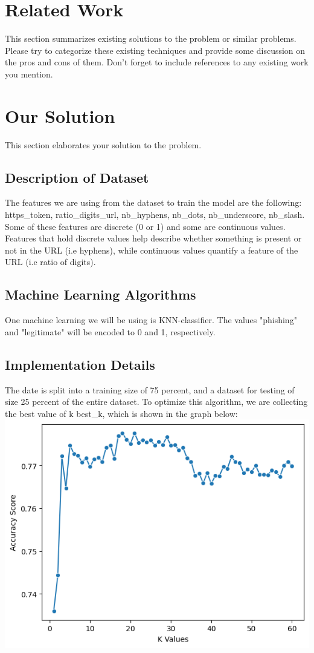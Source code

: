 \documentclass[conference]{IEEEtran}
\begin{document}
\section{Related Work}
This section summarizes existing solutions to the problem or similar problems. Please try to categorize these existing techniques and provide some discussion on the pros and cons of them. Don't forget to include references to any existing work you mention.  

\section{Our Solution}
This section elaborates your solution to the problem.

\subsection{Description of Dataset}
The features we are using from the dataset to train the model are the following: https_token, ratio_digits_url, nb_hyphens, nb_dots, nb_underscore, nb_slash. Some of these features are discrete (0 or 1) and some are continuous values. Features that hold discrete values help describe whether something is present or not in the URL (i.e hyphens), while continuous values quantify a feature of the URL (i.e ratio of digits).

\subsection{Machine Learning Algorithms}
One machine learning we will be using is KNN-classifier. The values "phishing" and "legitimate" will be encoded to 0 and 1, respectively. 

\subsection{Implementation Details}
The date is split into a training size of 75 percent, and a dataset for testing of size 25 percent of the entire dataset. To optimize this algorithm, we are collecting the best value of k best_k, which is shown in the graph below:
\includegraphics{best-k-value}
\end{document}
